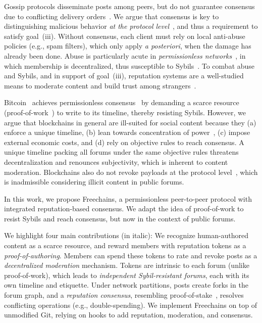 \documentclass[10pt,twocolumn]{article}
\newcommand{\FC}       {Freechains\xspace}
\begin{document}
Gossip protocols disseminate posts among peers, but do not guarantee consensus
due to conflicting delivery orders~\cite{p2p.intention,p2p.crdts}.
%
We argue that consensus is key to distinguishing malicious behavior \emph{at
the protocol level}~\cite{p2p.dag.sync}, and thus a requirement to satisfy
goal~(iii).
Without consensus, each client must rely on local anti-abuse policies (e.g.,
spam filters), which only apply \emph{a posteriori}, when the damage has
already been done.
%
Abuse is particularly acute in \emph{permissionless
networks}~\cite{permissionless,blockchain.wild}, in which membership is
decentralized, thus susceptible to Sybils~\cite{p2p.sybil,p2p.mastodon}.
%
To combat abuse and Sybils, and in support of goal~(iii), reputation systems
are a well-studied means to moderate content and build trust among
strangers~\cite{rep.systems,rep.eigentrust}.

Bitcoin~\cite{p2p.bitcoin} achieves permissionless
consensus~\cite{permissionless} by demanding a scarce resource
(proof-of-work~\cite{hashcash}) to write to its timeline, thereby resisting
Sybils.
%
However, we argue that blockchains in general are ill-suited for social
content because they
    (a) enforce a unique timeline,
    (b) lean towards concentration of power~\cite{btc.decentralization},
    (c) impose external economic costs, and
    (d) rely on objective rules to reach consensus.
%
A unique timeline packing all forums under the same objective rules
threatens decentralization and renounces subjectivity, which is inherent to
content moderation.
%
Blockchains also do not revoke payloads at the protocol
level~\cite{btc.content}, which is inadmissible considering illicit content in
public forums.

In this work, we propose \FC, a permissionless peer-to-peer protocol with
integrated reputation-based consensus.
We adapt the idea of proof-of-work to resist Sybils and reach consensus, but
now in the context of public forums.

We highlight four main contributions (in italic):
%
We recognize human-authored content as a scarce resource, and reward members
with reputation tokens as a \emph{proof-of-authoring}.
%
Members can spend these tokens to rate and revoke posts as a
\emph{decentralized moderation} mechanism.
%
Tokens are intrinsic to each forum (unlike proof-of-work), which leads to
\emph{independent Sybil-resistant forums}, each with its own timeline and
etiquette.
%
Under network partitions, posts create forks in the forum graph, and a
\emph{reputation consensus}, resembling proof-of-stake~\cite{pos.ouroboros},
resolves conflicting operations (e.g., double-spending).
%
We implement \FC on top of unmodified Git, relying on hooks to add reputation,
moderation, and consensus.
\end{document}
